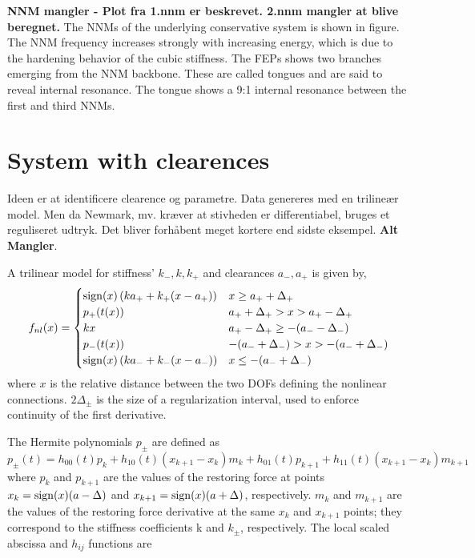 \textbf{NNM mangler - Plot fra 1.nnm er beskrevet. 2.nnm mangler at blive beregnet.}
The NNMs of the underlying conservative system is shown in figure. The NNM
frequency increases strongly with increasing energy, which is due to the
hardening behavior of the cubic stiffness. The FEPs shows two branches emerging
from the NNM backbone. These are called tongues and are said to reveal internal
resonance. The tongue shows a 9:1 internal resonance between the first and third
NNMs.


\section{System with clearences}
\label{sec:syst-with-clear}

Ideen er at identificere clearence og parametre. Data genereres med en trilineær
model. Men da Newmark, mv. kræver at stivheden er differentiabel, bruges et
reguliseret udtryk. Det bliver forhåbent meget kortere end sidste eksempel. \textbf{Alt Mangler}.

A trilinear model for stiffness' $k_-, k, k_+$ and clearances $a_-, a_+$ is
given by, %
\begin{equation}
  \label{eq:fnl_piecewise}
  f_{nl}(x) =
  \begin{cases}
    \operatorname{sign}(x) \left( ka_+ + k_+(x-a_+) \right) & x \geq a_+ + \Delta_+ \\
    p_+(t(x)) & a_+ + \Delta_+ > x > a_+ - \Delta_+ \\
    kx & a_+ - \Delta_+ \geq -(a_- - \Delta_-) \\
    p_-(t(x)) & -(a_- + \Delta_-) > x > -(a_- + \Delta_-) \\
    \operatorname{sign}(x) \left( ka_- + k_-(x-a_-) \right) & x \leq -(a_- + \Delta_-) \\
  \end{cases}
\end{equation}
where $x$ is the relative distance between the two DOFs defining the nonlinear
connections. $2\Delta_\pm$ is the size of a regularization interval, used to
enforce continuity of the first derivative.

The Hermite polynomials $p_\pm$ are defined as
\begin{equation}
  \label{eq:fnl_herm_pol}
  p_\pm(t) = h_{00}(t)p_k + h_{10}(t)(x_{k+1}-x_k)m_k + h_{01}(t)p_{k+1} + h_{11}(t)(x_{k+1} - x_k)m_{k+1}
\end{equation}
where $p_k$ and $p_{k+1}$ are the values of the restoring force at points $x_k =
\operatorname{sign}(x)(a - \Delta)$ and $x_{k+1} = \operatorname{sign}(x)(a + \Delta)$, respectively. $m_k$
and $m_{k+1}$ are the values of the restoring force derivative at the same $x_k$
and $x_{k+1}$ points; they correspond to the stiffness coefficients k and
$k_\pm$, respectively. The local scaled abscissa and $h_{ij}$ functions are

